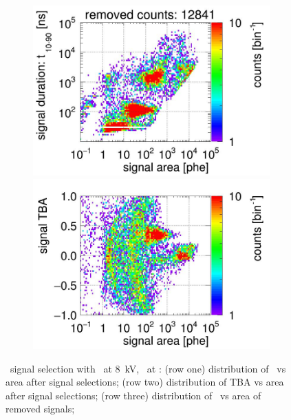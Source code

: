 \begin{landscape}
\begin{figure}[!p]
\begin{subfigure}[t]{0.32\textwidth}
			\includegraphics[width=\figurewidth,clip,trim={0 98 0 15}]{Figures/GasTest/CutsValid/res64765/pdpaX29Vecfig64765.jpg}
			\includegraphics[width=\figurewidth,clip,trim={0 8 0 40}]{Figures/GasTest/CutsValid/res64765/tbapaX29Vecfig64765.jpg}
			\caption{}
			\label{fig:signal selection dv 08 04}
		\end{subfigure}
		\caption[\gtest\ signal selection with \opdv\ at \SI{8}{\kV}, \opgd\ at \standarddensity .]{\gtest\ signal selection with \opdv\ at \SI{8}{\kV}, \opgd\ at \standarddensity : 
			(row one) distribution of \rpdshort\ vs area after signal selections;
			(row two) distribution of TBA vs area after signal selections;
			(row three) distribution of \rpdshort\ vs area of removed signals;
}
\end{figure}
\end{landscape}
